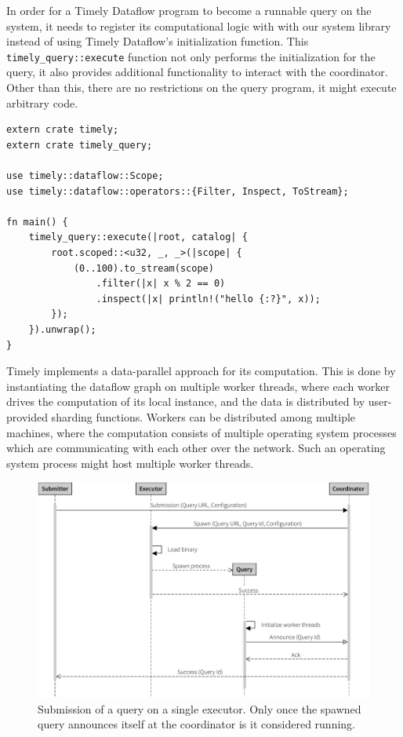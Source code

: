 In order for a Timely Dataflow program to become a runnable query on the system,
it needs to register its computational logic with with our system library instead of
using Timely Dataflow's initialization function. This
\lstinline{timely_query::execute} function not only performs the initialization
for the query, it also provides additional functionality to interact with the
coordinator. Other than this, there are no restrictions on the query program,
it might execute arbitrary code. %

\begin{lstlisting}[caption={[Example query.]Example query which creates a stream of integers,
filters out all odd numbers and then prints the rest.}]
extern crate timely;
extern crate timely_query;

use timely::dataflow::Scope;
use timely::dataflow::operators::{Filter, Inspect, ToStream};

fn main() {
    timely_query::execute(|root, catalog| {
        root.scoped::<u32, _, _>(|scope| {
            (0..100).to_stream(scope)
                .filter(|x| x % 2 == 0)
                .inspect(|x| println!("hello {:?}", x));
        });
    }).unwrap();
}
\end{lstlisting}

Timely implements a data-parallel approach for its computation. This is done by
instantiating the dataflow graph on multiple worker threads, where each worker
drives the computation of its local instance, and the data is distributed by
user-provided sharding functions. Workers can be distributed among multiple
machines, where the computation consists of multiple operating system processes
which are communicating with each other over the network. Such an
operating system process might host multiple worker threads.

\begin{figure}[htb]
  \centering
    \includegraphics[width=1\textwidth]{figures/spawn_singleprocess}
  \caption[Query submission with single process.]{Submission of a query on a single executor.
  Only once the spawned query announces itself at the coordinator is it considered running.}
  \label{fig:subsingle}
\end{figure}

